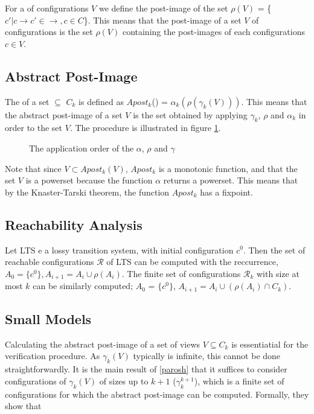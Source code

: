 For a  of configurations $V$ we define the post-image of the set $\rho(V)$ = \{$c' | c \rightarrow c' \in \rightarrow, c\in C$\}. This means that the post-image of a set $V$ of configurations is the set $\rho(V)$ containing the post-images of each configurations $c\in V$.

\subsection{Abstract Post-Image}
The  of a set  $\subseteq$ $C_k$ is defined as $Apost_k$() = $\alpha_k(\rho(\gamma_k(V)))$. This means that the abstract post-image of a set $V$ is the set obtained by applying $\gamma_k$, $\rho$ and $\alpha_k$ in order to the set $V$. The procedure is illustrated in figure \ref{apost}.
\begin{figure}
\abstraction
\caption{The application order of the $\alpha$, $\rho$ and $\gamma$}
\label{apost}
\end{figure}

Note that since $V \subset Apost_k(V)$, $Apost_k$ is a monotonic function, and that the set $V$ is a powerset because the function $\alpha$ returns a powerset. This means that by the Knaster-Tarski theorem, the function $Apost_k$ has a fixpoint.

\subsection{Reachability Analysis}
\label{reachcompute}
Let LTS e a lossy transition system, with initial configuration $c^0$. Then the set of reachable configurations $\mathcal{R}$ of LTS can be computed with the reccurrence, $A_0 = \{c^0\}, A_{i+1}= A_i \cup \rho(A_i)$. The finite set of configurations $\mathcal{R}_k$ with size at most $k$ can be similarly computed; $A_0$ = $\{c^0\}$, $A_{i+1} = A_i \cup (\rho(A_i) \cap C_k)$.

\subsection{Small Models}
\label{proof}
Calculating the abstract post-image of a set of views $V \subseteq C_k$ is essentiatial for the verification procedure. As $\gamma_k(V)$ typically is infinite, this cannot be done straightforwardly. It is the main result of \ref{parosh} that it suffices to consider configurations of $\gamma_k(V)$ of sizes up to $k+1$ ($\gamma_k^{k+1}$), which is a finite set of configurations for which the abstract post-image can be computed. Formally, they show that

